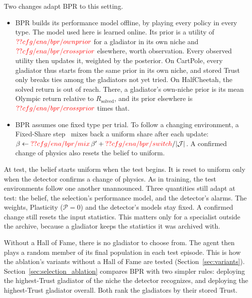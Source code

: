 Two changes adapt BPR to this setting.
\begin{itemize}
\item BPR builds its performance model offline, by playing every policy in every type. The model used here is learned online. Its prior is a utility of $\Res{cfg/ena/bpr/ownprior}$ for a gladiator in its own niche and $\Res{cfg/ena/bpr/crossprior}$ elsewhere, worth  observation. Every observed utility then updates it, weighted by the posterior. On CartPole, every gladiator thus starts from the same prior in its own niche, and stored Trust only breaks ties among the gladiators not yet tried. On HalfCheetah, the solved return is out of reach. There, a gladiator's own-niche prior is its mean Olympic return relative to $R_{\text{solved}}$, and its prior elsewhere is $\Res{cfg/ena/bpr/crossprior}$ times that.
\item BPR assumes one fixed type per trial. To follow a changing environment, a Fixed-Share step~\cite{herbster1998tracking} mixes back a uniform share after each update: $\beta \leftarrow \Res{cfg/ena/bpr/mix}\,\beta' + \Res{cfg/ena/bpr/switch}/|\mathcal{J}|$. A confirmed change of physics also resets the belief to uniform.
\end{itemize}
At test, the belief starts uniform when the test begins. It is reset to uniform only when the detector confirms a change of physics. As in training, the test environments follow one another unannounced. Three quantities still adapt at test: the belief, the selection's performance model, and the detector's alarms. The weights, Plasticity ($\mathcal{P}=0$) and the detector's models stay fixed. A confirmed change still resets the input statistics. This matters only for a specialist outside the archive, because a gladiator keeps the statistics it was archived with.

Without a Hall of Fame, there is no gladiator to choose from. The agent then plays a random member of its final population in each test episode. This is how the ablation's variants without a Hall of Fame are tested (Section~\ref{sec:variants}). Section~\ref{sec:selection_ablation} compares BPR with two simpler rules: deploying the highest-Trust gladiator of the niche the detector recognizes, and deploying the highest-Trust gladiator overall. Both rank the gladiators by their stored Trust.
